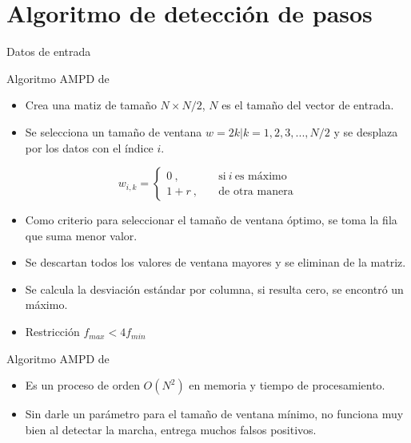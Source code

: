 \documentclass{beamer} %
\begin{document}
\section{Algoritmo de detección de pasos}

\begin{frame}{Datos de entrada}
    
\end{frame}

\begin{frame}{Algoritmo AMPD de \citep{scholkmann}}
    \begin{itemize}
        \item Crea una matiz de tamaño $N \times N/2$, $N$ es el tamaño del vector de entrada. 
        \item Se selecciona un tamaño de ventana $w = 2k | k = 1,2,3, ..., N/2$ y se desplaza por los datos con el índice $i$.
    \end{itemize}
    \begin{equation}
     w_{i,k} =
    \begin{cases}
    0\ , & \quad \text{si}\ i\ \text{es máximo} \\ 
    1 + r\ , & \quad \text{de otra manera} 
    \end{cases}
    \end{equation}
    \begin{itemize}
        \item Como criterio para seleccionar el tamaño de ventana óptimo, se toma la fila que suma menor valor. 
        \item Se descartan todos los valores de ventana mayores y se eliminan de la matriz. 
        \item Se calcula la desviación estándar por columna, si resulta cero, se encontró un máximo. 
        \item Restricción $f_{max} < 4 f_{min}$
    \end{itemize}
\end{frame}

\begin{frame}{Algoritmo AMPD de \citep{scholkmann}}
    \begin{itemize}
        \item Es un proceso de orden $O(N^2)$ en memoria y tiempo de procesamiento.
        \item Sin darle un parámetro para el tamaño de ventana mínimo, no funciona muy bien al detectar la marcha, entrega muchos falsos positivos. 
    \end{itemize}
\end{frame}
\end{document}
